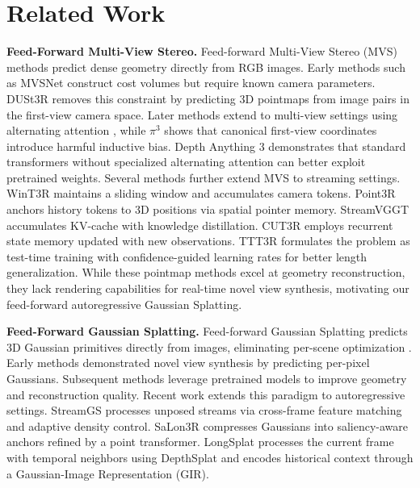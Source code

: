 \documentclass[runningheads]{llncs}
\begin{document}
\section{Related Work}

\noindent \textbf{Feed-Forward Multi-View Stereo.}
Feed-forward Multi-View Stereo (MVS) methods predict dense geometry directly from RGB images.
Early methods such as MVSNet \cite{yao2018mvsnet, yao2019recurrentmvsnet} construct cost volumes but require known camera parameters.
DUSt3R \cite{Wang_2024_CVPR} removes this constraint by predicting 3D pointmaps from image pairs in the first-view camera space.
Later methods extend to multi-view settings using alternating attention \cite{wang2025vggt, keetha2026mapanything}, while $\pi^3$ \cite{pi3} shows that canonical first-view coordinates introduce harmful inductive bias.
Depth Anything 3 \cite{depthanything3} demonstrates that standard transformers without specialized alternating attention can better exploit pretrained weights.
Several methods further extend MVS to streaming settings.
WinT3R \cite{li2025wint3rwindowbasedstreamingreconstruction} maintains a sliding window and accumulates camera tokens.
Point3R \cite{wu2025pointr} anchors history tokens to 3D positions via spatial pointer memory.
StreamVGGT \cite{streamVGGT} accumulates KV-cache with knowledge distillation.
CUT3R \cite{cut3r} employs recurrent state memory updated with new observations.
TTT3R \cite{chen2025ttt3r} formulates the problem as test-time training \cite{sun2025learninglearntesttime} with confidence-guided learning rates for better length generalization.
While these pointmap methods excel at geometry reconstruction, they lack rendering capabilities for real-time novel view synthesis, motivating our feed-forward autoregressive Gaussian Splatting.

\vspace{1mm}
\noindent \textbf{Feed-Forward Gaussian Splatting.}
Feed-forward Gaussian Splatting predicts 3D Gaussian primitives directly from images, eliminating per-scene optimization \cite{zhang2025advancesfeedforward3dreconstruction}.
Early methods \cite{charatan23pixelsplat, szymanowicz24splatter, gslrm2024} demonstrated novel view synthesis by predicting per-pixel Gaussians.
Subsequent methods \cite{ye2025no, ye2025yonosplatneedmodelfeedforward, jiang2025anysplat} leverage pretrained models to improve geometry and reconstruction quality.
%
Recent work extends this paradigm to autoregressive settings.
StreamGS \cite{StreamGS} processes unposed streams via cross-frame feature matching and adaptive density control.
SaLon3R \cite{SaLon3R} compresses Gaussians into saliency-aware anchors refined by a point transformer.
LongSplat \cite{huang2025longsplatonlinegeneralizable3d} processes the current frame with temporal neighbors using DepthSplat \cite{xu2024depthsplat} and encodes historical context through a Gaussian-Image Representation (GIR).
\end{document}
